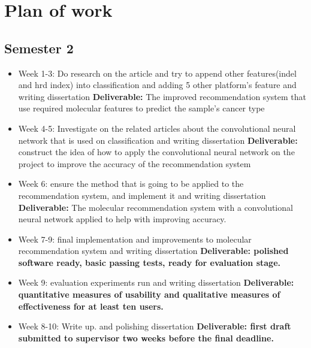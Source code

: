 \documentclass[11pt]{article}
\begin{document}
\section{Plan of work}\label{plan-of-work}

\subsection{Semester 2}

\begin{itemize}
    
    \item
	Week 1-3: Do research on the article and try to append other features(indel and hrd index) into classification and adding 5 other platform's feature and writing dissertation \textbf{Deliverable:}
	The improved recommendation system that use required molecular features to predict the sample's cancer type
	\item
	Week 4-5: Investigate on the related articles about the convolutional neural network that is used on classification and writing dissertation \textbf{Deliverable:}
	construct the idea of how to apply the convolutional neural network on the project to improve the accuracy of the recommendation system
	\item
	Week 6: ensure the method that is going to be applied to the recommendation system, and implement it and writing dissertation
	\textbf{Deliverable:} The molecular recommendation system with a convolutional neural network applied to help with improving accuracy.
	\item
	Week 7-9: final implementation and improvements to molecular recommendation system and writing dissertation
	\textbf{Deliverable: polished software ready, basic passing tests,
	ready for evaluation stage.}
	\item
	Week 9: evaluation experiments run and writing dissertation \textbf{Deliverable: quantitative
	measures of usability and qualitative measures of effectiveness for at
	least ten users.}
	\item
	Week 8-10: Write up. and polishing dissertation \textbf{Deliverable: first draft submitted to
	supervisor two weeks before the final deadline.}
    \end{itemize}
    
\end{document}
